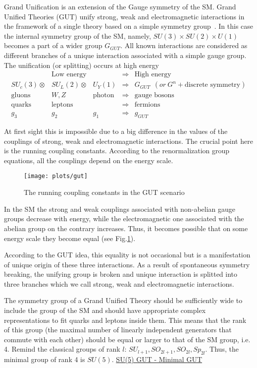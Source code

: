 \documentclass{cernyrep}
\begin{document}
Grand Unification is an extension of the Gauge symmetry of the SM. Grand Unified Theories (GUT)
unify strong, weak and electromagnetic interactions in the framework of a single theory based on a simple symmetry group~\cite{GUT}. In this case the internal symmetry group of the SM, namely, $SU(3)\times SU(2)\times U(1)$ becomes a part of a wider group $G_{GUT}$.
All known interactions are considered as different branches of a unique
interaction associated with a simple gauge group. The unification
 (or splitting) occurs at high energy
$$\begin{array}{ccccl}
 & \mbox{Low energy} & & \Rightarrow & \mbox{High energy} \\
SU_c(3) \otimes & SU_L(2) \otimes & U_Y(1) & \Rightarrow &
 G_{GUT} \ \ (or \ G^n + \mbox{discrete  symmetry}) \\
\mbox{gluons} & W , Z & \mbox{photon} & \Rightarrow & \mbox{
gauge bosons} \\
\mbox{quarks} & \mbox{leptons} & & \Rightarrow & \mbox{fermions} \\
g_3 & g_2 & g_1 & \Rightarrow & g_{GUT} \end{array} $$

At first sight this is impossible due to a big difference in
the values of the couplings of strong, weak and electromagnetic
interactions. The crucial point here is the running coupling
constants. According to the renormalization group equations,
all the couplings depend on the energy scale. 
\begin{figure}[htb]
\begin{center}
\texttt{[image: plots/gut]}
\caption{The running coupling constants in the GUT scenario}
\label{151}
\end{center}
\end{figure}
 In the SM the strong and weak couplings associated with
non-abelian gauge groups decrease with energy, while the
electromagnetic one associated with the abelian group on the
contrary increases. Thus, it becomes possible that on some
energy scale they become equal (see Fig.\ref{151}).

According to the GUT idea, this equality is not occasional
but is a manifestation of unique origin of these three
interactions. As a result of spontaneous symmetry breaking,
the unifying group is broken and unique interaction
is splitted into three branches which we call strong, weak
 and electromagnetic interactions. 
 
 
 The symmetry group of a Grand Unified Theory should be sufficiently wide to include the group of the SM and should have appropriate complex representations to fit quarks and leptons inside them.
 This means that the rank of this group (the maximal number of linearly independent generators that commute with each other) should be equal or larger to that of the SM group, i.e. 4. Remind the classical groups of rank $l$: $SU_{l+1},SO_{2l+1},SO_{2l},Sp_{2l}$. Thus, the minimal group  of rank 4 is $SU(5)$. 
 \underline{SU(5) GUT - Minimal GUT}
\end{document}
